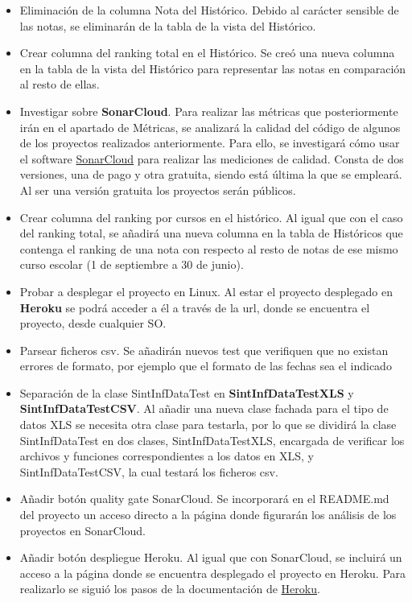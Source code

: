 \begin{itemize}
	\item Eliminación de la columna Nota del Histórico. 
		Debido al carácter sensible de las notas, se eliminarán de la tabla de la vista del Histórico.
	\item Crear columna del ranking total en el Histórico. 
		Se creó una nueva columna en la tabla de la vista del Histórico para representar las notas en comparación al resto de ellas.
	\item Investigar sobre \textbf{SonarCloud}. 
		Para realizar las métricas que posteriormente irán en el apartado de Métricas, se analizará la calidad del código de algunos de los proyectos realizados anteriormente. Para ello, se investigará cómo usar el software \href{https://sonarcloud.io/}{SonarCloud} para realizar las mediciones de calidad. Consta de dos versiones, una de pago y otra gratuita, siendo está última la que se empleará. Al ser una versión gratuita los proyectos serán públicos. 
	\item Crear columna del ranking por cursos en el histórico. 
		Al igual que con el caso del ranking total, se añadirá una nueva columna en la tabla de Históricos que contenga el ranking de una nota con respecto al resto de notas de ese mismo curso escolar (1 de septiembre a 30 de junio). 
	\item Probar a desplegar el proyecto en Linux. 
	 	Al estar el proyecto desplegado en \textbf{Heroku} se podrá acceder a él a través de la url, donde se encuentra el proyecto, desde cualquier SO.
	\item Parsear ficheros csv. 
		Se añadirán nuevos test que verifiquen que no existan errores de formato, por ejemplo que el formato de las fechas sea el indicado
	\item Separación de la clase SintInfDataTest en \textbf{SintInfDataTestXLS} y \textbf{SintInfDataTestCSV}. 
		 Al añadir una nueva clase fachada para el tipo de datos XLS se necesita otra clase para testarla, por lo que se dividirá la clase SintInfDataTest en dos clases, SintInfDataTestXLS, encargada de verificar los archivos y funciones correspondientes a los datos en XLS, y SintInfDataTestCSV, la cual testará los ficheros csv.
	 \item Añadir botón quality gate SonarCloud.  
		 Se incorporará en el README.md del proyecto un acceso directo a la página donde figurarán los análisis de los proyectos en SonarCloud. 
	 \item Añadir botón despliegue Heroku. 
	  	Al igual que con SonarCloud, se incluirá un acceso a la página donde se encuentra desplegado el proyecto en Heroku. Para realizarlo se siguió los pasos de la documentación de \href{https://devcenter.heroku.com/articles/heroku-button}{Heroku}.

\end{itemize}
